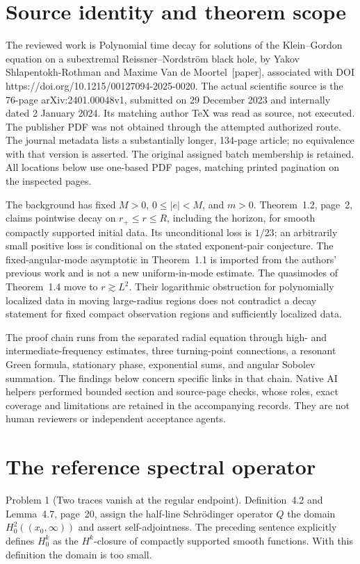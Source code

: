 \documentclass[10pt]{article}
\begin{document}
\section*{Source identity and theorem scope}
The reviewed work is Polynomial time decay for solutions of the Klein–Gordon equation on a subextremal Reissner–Nordström black hole, by Yakov Shlapentokh-Rothman and Maxime Van de Moortel [paper], associated with DOI https://doi.org/10.1215/00127094-2025-0020. The actual scientific source is the 76-page arXiv:2401.00048v1, submitted on 29 December 2023 and internally dated 2 January 2024. Its matching author TeX was read as source, not executed. The publisher PDF was not obtained through the attempted authorized route. The journal metadata lists a substantially longer, 134-page article; no equivalence with that version is asserted. The original assigned batch membership is retained. All locations below use one-based PDF pages, matching printed pagination on the inspected pages.\par
The background has fixed \(M>0\), \(0\leq |e|<M\), and \(m>0\). Theorem 1.2, page 2, claims pointwise decay on \(r_+\leq r\leq R\), including the horizon, for smooth compactly supported initial data. Its unconditional loss is \(1/23\); an arbitrarily small positive loss is conditional on the stated exponent-pair conjecture. The fixed-angular-mode asymptotic in Theorem 1.1 is imported from the authors’ previous work and is not a new uniform-in-mode estimate. The quasimodes of Theorem 1.4 move to \(r\gtrsim L^2\). Their logarithmic obstruction for polynomially localized data in moving large-radius regions does not contradict a decay statement for fixed compact observation regions and sufficiently localized data.\par
The proof chain runs from the separated radial equation through high- and intermediate-frequency estimates, three turning-point connections, a resonant Green formula, stationary phase, exponential sums, and angular Sobolev summation. The findings below concern specific links in that chain. Native AI helpers performed bounded section and source-page checks, whose roles, exact coverage and limitations are retained in the accompanying records. They are not human reviewers or independent acceptance agents.\par
\section*{The reference spectral operator}
Problem 1 (Two traces vanish at the regular endpoint).  Definition 4.2 and Lemma 4.7, page 20, assign the half-line Schrödinger operator \(Q\) the domain \(H^2_0((x_0,\infty))\) and assert self-adjointness. The preceding sentence explicitly defines \(H^k_0\) as the \(H^k\)-closure of compactly supported smooth functions. With this definition the domain is too small.\par
\end{document}

